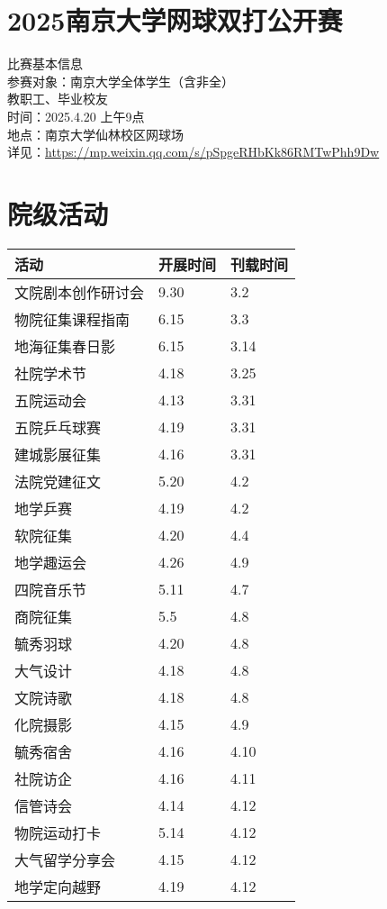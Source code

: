\documentclass[letterpaper, 12pt]{article}
\begin{document}
\begin{multicols}{2}
\section{2025南京大学网球双打公开赛}
比赛基本信息
\\参赛对象：南京大学全体学生（含非全）
\\                  教职工、毕业校友
\\时间：2025.4.20 上午9点
\\地点：南京大学仙林校区网球场
\\详见：\url{https://mp.weixin.qq.com/s/pSpgeRHbKk86RMTwPhh9Dw}

\section{院级活动}
\begin{tabular}{|>{\centering\arraybackslash}m{}|m{}|m{}|}
\hline
    活动 & 开展时间 & 刊载时间\\
    \hline\hline
    文院剧本创作研讨会 & 9.30 & 3.2\\
    物院征集课程指南 & 6.15 & 3.3\\
    地海征集春日影 & 6.15 & 3.14\\
    社院学术节 & 4.18 & 3.25\\
    五院运动会 & 4.13 & 3.31\\
    五院乒乓球赛 & 4.19 & 3.31\\
    建城影展征集 & 4.16 & 3.31\\
    法院党建征文 & 5.20 & 4.2\\
    地学乒赛 & 4.19 & 4.2\\
    软院征集 & 4.20 & 4.4\\
    地学趣运会 & 4.26 & 4.9\\
    四院音乐节 & 5.11 & 4.7\\
    商院征集 & 5.5 & 4.8\\
    毓秀羽球 & 4.20 & 4.8\\
    大气设计 & 4.18 & 4.8\\
    文院诗歌 & 4.18 & 4.8\\
    化院摄影 & 4.15 & 4.9\\
    毓秀宿舍 & 4.16 & 4.10\\
    社院访企 & 4.16 & 4.11\\
    信管诗会 & 4.14 & 4.12\\
    物院运动打卡 & 5.14 & 4.12\\
    大气留学分享会 & 4.15 & 4.12\\
    地学定向越野 & 4.19 & 4.12\\
    \hline
\end{tabular}



\end{multicols}
\end{document}
